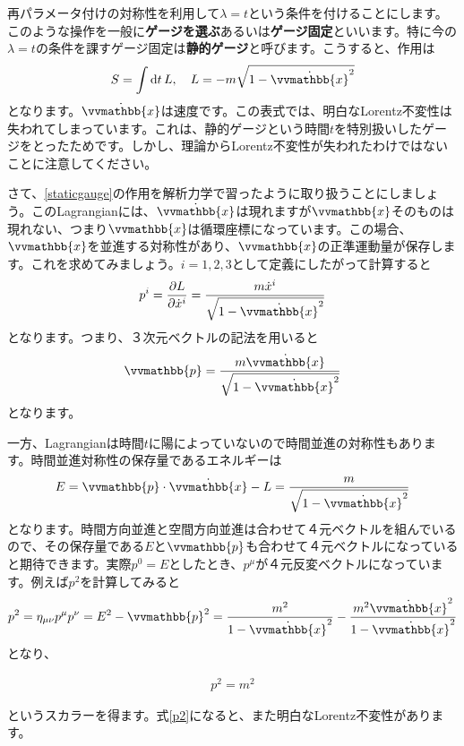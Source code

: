 \documentclass[report,paper=a4, fontsize=12pt, line_length=16cm, number_of_lines=33,dvipdfmx]{jlreq}
\newenvironment{important}{\begin{tcolorbox}[
  colback = white,
  colframe = red!35,
  boxrule = 2mm,
  fonttitle = \bfseries,
  after = \noindent] }{\end{tcolorbox}}
\numberwithin{equation}{chapter}
\newcommand{\strong}[1]{{\sffamily \bfseries #1}}
\newcommand{\xb}{\vvmathbb{x}}
\newcommand{\pbb}{\vvmathbb{p}}
\begin{document}
再パラメータ付けの対称性を利用して$\lambda=t$という条件を付けることにします。このような操作を一般に\strong{ゲージを選ぶ}あるいは\strong{ゲージ固定}といいます。特に今の$\lambda=t$の条件を課すゲージ固定は\strong{静的ゲージ}と呼びます。こうすると、作用は
\begin{align}
  S=\int \dd{t} L,\quad L=-m\sqrt{1-\dot{\xb}^2}\label{staticgauge}
\end{align}
となります。$\dot{\xb}$は速度です。この表式では、明白なLorentz不変性は失われてしまっています。これは、静的ゲージという時間$t$を特別扱いしたゲージをとったためです。しかし、理論からLorentz不変性が失われたわけではないことに注意してください。

さて、\eqref{staticgauge}の作用を解析力学で習ったように取り扱うことにしましょう。このLagrangianには、$\dot{\xb}$は現れますが$\xb$そのものは現れない、つまり$\xb$は循環座標になっています。この場合、$\xb$を並進する対称性があり、$\xb$の正準運動量が保存します。これを求めてみましょう。$i=1,2,3$として定義にしたがって計算すると
\begin{align}
  p^i=\pdv{L}{\dot{x}^i}=\frac{m\dot{x}^i}{\sqrt{1-\dot{\xb}^2}}
\end{align}
となります。つまり、３次元ベクトルの記法を用いると
\begin{align}
  \pbb=\frac{m\dot{\xb}}{\sqrt{1-\dot{\xb}^2}}
\end{align}
となります。

一方、Lagrangianは時間$t$に陽によっていないので時間並進の対称性もあります。時間並進対称性の保存量であるエネルギーは
\begin{align}
  E=\pbb\cdot \dot{\xb}-L=\frac{m}{\sqrt{1-\dot{\xb}^2}}
\end{align}
となります。時間方向並進と空間方向並進は合わせて４元ベクトルを組んでいるので、その保存量である$E$と$\pbb$も合わせて４元ベクトルになっていると期待できます。実際$p^0=E$としたとき、$p^{\mu}$が４元反変ベクトルになっています。例えば$p^2$を計算してみると
\begin{align}
  p^2=\eta_{\mu\nu}p^{\mu}p^{\nu}=E^2-\pbb^2
=\frac{m^2}{1-\dot{\xb}^2}-\frac{m^2\dot{\xb}^2}{1-\dot{\xb}^2}
\end{align}
となり、
\begin{important}
  \begin{align}
    p^2=m^2\label{p2}
  \end{align}  
\end{important}
というスカラーを得ます。式\eqref{p2}になると、また明白なLorentz不変性があります。
\end{document}
